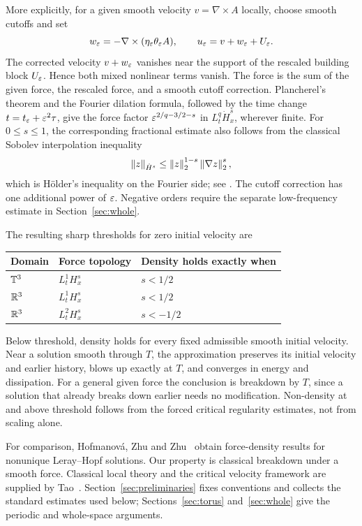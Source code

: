 More explicitly, for a given smooth velocity $v=\nabla\times A$ locally,
choose smooth cutoffs and set
\[
 w_\varepsilon=-\nabla\times(\eta_\varepsilon\theta_\varepsilon A),\qquad
 u_\varepsilon=v+w_\varepsilon+U_\varepsilon.
\]
The corrected velocity $v+w_\varepsilon$ vanishes near the support of the rescaled
building block $U_\varepsilon$. Hence both mixed nonlinear terms vanish. The force
is the sum of the given force, the rescaled force, and a smooth cutoff
correction. Plancherel's theorem and the Fourier dilation formula, followed
by the time change $t=t_\varepsilon+\varepsilon^2\tau$, give the force factor
$\varepsilon^{2/q-3/2-s}$ in $L^q_t\dot H^s_x$, wherever finite.
For $0\le s\le1$, the corresponding fractional estimate also follows from
the classical Sobolev interpolation inequality
\[
 \left\lVert z\right\rVert_{\dot H^s}\le\left\lVert z\right\rVert_2^{1-s}\left\lVert\nabla z\right\rVert_2^s,
\]
which is H\"older's inequality on the Fourier side; see
\cite[Chapter~4, Sections~1--2]{taylor2011}. The cutoff correction has one
additional power of $\varepsilon$. Negative orders require the separate
low-frequency estimate in Section~\ref{sec:whole}.

The resulting sharp thresholds for zero initial velocity are
\begin{center}
\begin{tabular}{lll}
\toprule Domain & Force topology & Density holds exactly when\\
\midrule
$\mathbb T^3$ & $L^1_tH^s_x$ & $s<1/2$\\
$\mathbb R^3$ & $L^1_tH^s_x$ & $s<1/2$\\
$\mathbb R^3$ & $L^2_tH^s_x$ & $s<-1/2$\\
\bottomrule
\end{tabular}
\end{center}
Below threshold, density holds for every fixed admissible smooth initial
velocity. Near a solution smooth through $T$, the approximation preserves
its initial velocity and earlier history, blows up exactly at $T$, and
converges in energy and dissipation. For a general given force the conclusion
is breakdown by $T$, since a solution that already breaks down earlier needs
no modification. Non-density at and above threshold follows from the forced
critical regularity estimates, not from scaling alone.

For comparison, Hofmanov\'a, Zhu and Zhu~\cite[Theorem~1.4, Corollary~4.6,
Theorem~5.1]{hzz2024} obtain force-density results for nonunique Leray--Hopf
solutions. Our property is classical breakdown under a smooth force.
Classical local theory and the critical velocity framework are supplied by
Tao~\cite{tao2013,tao2018}. Section~\ref{sec:preliminaries} fixes conventions and collects
the standard estimates used below; Sections~\ref{sec:torus}
and~\ref{sec:whole} give the periodic and whole-space arguments.
